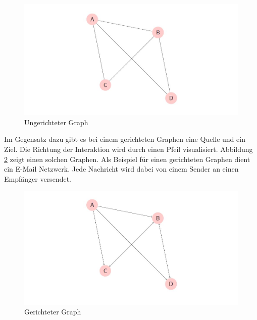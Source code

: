 \begin{figure}[h]
    \centering
    \includegraphics[scale=0.7]{resources/graph_undirected.JPG}
    \caption{Ungerichteter Graph}
    \label{fig:graph_undirected}
\end{figure}

Im Gegensatz dazu gibt es bei einem gerichteten Graphen eine Quelle und ein Ziel. Die Richtung der Interaktion wird durch einen Pfeil visualisiert.
Abbildung \ref{fig:graph_directed} zeigt einen solchen Graphen.
Als Beispiel für einen gerichteten Graphen dient ein E-Mail Netzwerk. Jede Nachricht wird dabei von einem Sender an einen Empfänger versendet.

\begin{figure}[h]
    \centering
    \includegraphics[scale=0.7]{resources/graph_directed.JPG}
    \caption{Gerichteter Graph}
    \label{fig:graph_directed}
\end{figure}

